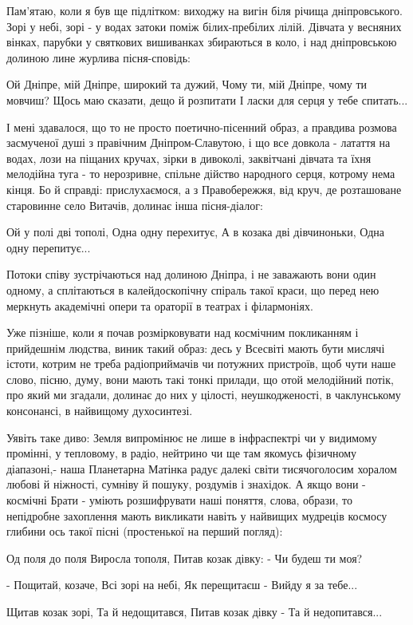 Пам'ятаю, коли я був ще підлітком: виходжу на вигін біля річища дніпровського.
Зорі у небі, зорі - у водах затоки поміж білих-пребілих лілій. Дівчата у
весняних вінках, парубки у святкових вишиванках збираються в коло, і над
дніпровською долиною лине журлива пісня-сповідь:

Ой Дніпре, мій Дніпре, широкий та дужий,
Чому ти, мій Дніпре, чому ти мовчиш?
Щось маю сказати, дещо й розпитати
І ласки для серця у тебе спитать...

І мені здавалося, що то не просто поетично-пісенний образ, а правдива розмова
засмученої душі з правічним Дніпром-Славутою, і що все довкола - латаття на
водах, лози на піщаних кручах, зірки в дивоколі, заквітчані дівчата та їхня
мелодійна туга - то нерозривне, спільне дійство народного серця, котрому нема
кінця. Бо й справді: прислухаємося, а з Правобережжя, від круч, де розташоване
старовинне село Витачів, долинає інша пісня-діалог:

Ой у полі дві тополі,
Одна одну перехитує,
А в козака дві дівчиноньки,
Одна одну перепитує...

Потоки співу зустрічаються над долиною Дніпра, і не заважають вони один одному,
а сплітаються в калейдоскопічну спіраль такої краси, що перед нею меркнуть
академічні опери та ораторії в театрах і філармоніях.

Уже пізніше, коли я почав розмірковувати над космічним покликанням і прийдешнім
людства, виник такий образ: десь у Всесвіті мають бути мислячі істоти, котрим
не треба радіоприймачів чи потужних пристроїв, щоб чути наше слово, пісню,
думу, вони мають такі тонкі прилади, що отой мелодійний потік, про який ми
згадали, долинає до них у цілості, неушкодженості, в чаклунському консонансі, в
найвищому духосинтезі.

Уявіть таке диво: Земля випромінює не лише в інфраспектрі чи у видимому
промінні, у тепловому, в радіо, нейтрино чи ще там якомусь фізичному
діапазоні,- наша Планетарна Матінка радує далекі світи тисячоголосим хоралом
любові й ніжності, сумніву й пошуку, роздумів і знахідок. А якщо вони -
космічні Брати - уміють розшифрувати наші поняття, слова, образи, то непідробне
захоплення мають викликати навіть у найвищих мудреців космосу глибини ось такої
пісні (простенької на перший погляд):

Од поля до поля
Виросла тополя,
Питав козак дівку:
- Чи будеш ти моя?

- Пощитай, козаче,
Всі зорі на небі,
Як перещитаєш -
Вийду я за тебе...

Щитав козак зорі,
Та й недощитався,
Питав козак дівку -
Та й недопитався...

